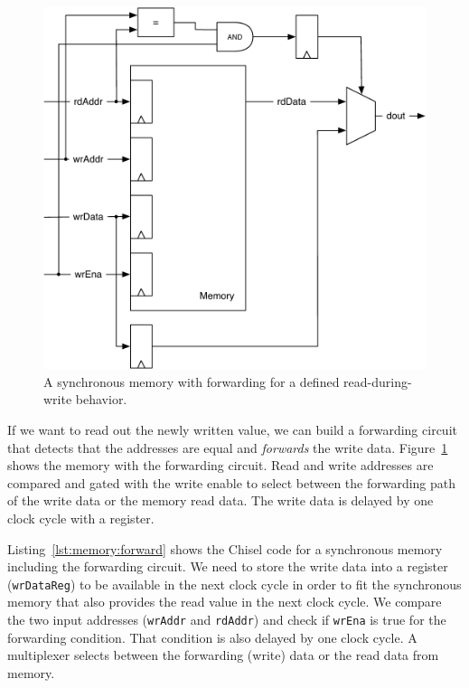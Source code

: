 \documentclass[%
    10pt,
    headinclude, footexclude,
    openright, %
    notitlepage,
    cleardoubleempty,
    headsepline,
    pointlessnumbers,
    bibtotoc, idxtotoc,
    ]{scrbook}
\newcommand{\code}[1]{{\small{\texttt{#1}}}}
\newcommand{\scale}{0.7}
\begin{document}
\begin{figure}
  \centering
  \includegraphics[scale=\scale]{figures/memory-forwarding}
  \caption{A synchronous memory with forwarding for a defined read-during-write behavior.}
  \label{fig:memory:forwarding}
\end{figure}

If we want to read out the newly written value, we can build a forwarding
circuit that detects that the addresses are equal and \emph{forwards} the
write data. Figure~\ref{fig:memory:forwarding} shows the memory with
the forwarding circuit. Read and write addresses are compared and gated with
the write enable to select between the forwarding path of the write data or the
memory read data. The write data is delayed by one clock cycle with a register.

Listing~\ref{lst:memory:forward} shows the Chisel code for a synchronous memory
including the forwarding circuit. We need to store the write data into a register
(\code{wrDataReg}) to be available in the next clock cycle in order to fit
the synchronous memory that also provides the read value in the next clock
cycle.
We compare the two input addresses (\code{wrAddr} and \code{rdAddr})
and check if \code{wrEna} is true for the forwarding condition.
That condition is also delayed by one clock cycle.
A multiplexer selects between the forwarding (write) data or the read
data from memory.
\end{document}
